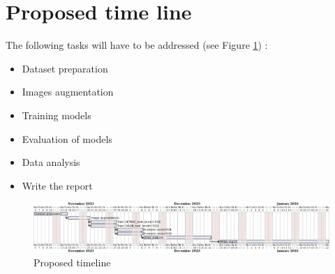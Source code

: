 \documentclass[]{article}
\begin{document}
\section{Proposed time line}

The following tasks will have to be addressed (see Figure \ref{fig:timeline}) :
\begin{itemize}
	\item Dataset preparation
	\item Images augmentation
	\item Training models
	\item Evaluation of models
	\item Data analysis
	\item Write the report
\end{itemize}

\begin{figure}[h]
	\centering
	\includegraphics[width=\textwidth]{proposal-timing}
	\caption{Proposed timeline}
	\label{fig:timeline}
\end{figure}

\printbibliography
\end{document}
